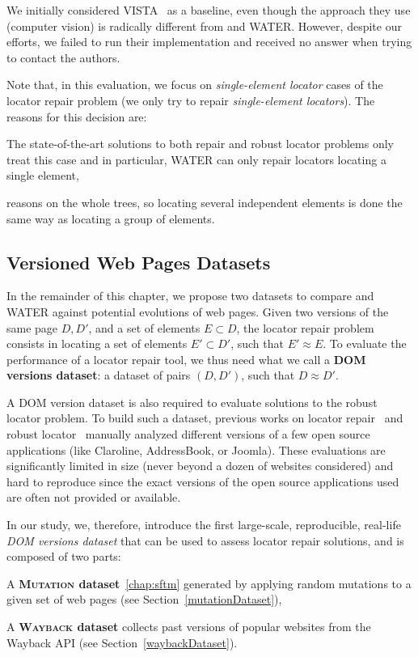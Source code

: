 We initially considered VISTA~\cite{stocco2018visual} as a baseline, even though the approach they use (computer vision) is radically different from \erratum{} and WATER.
However, despite our efforts, we failed to run their implementation and received no answer when trying to contact the authors. 

Note that, in this evaluation, we focus on \textit{single-element locator} cases of the locator repair problem (we only try to repair \textit{single-element locators}).
The reasons for this decision are:
\begin{inparaenum}
    \item The state-of-the-art solutions to both repair and robust locator problems only treat this case and in particular, WATER can only repair locators locating a single element,
    \item \erratum{} reasons on the whole trees, so locating several independent elements is done the same way as locating a group of elements.
\end{inparaenum}

\subsection{Versioned Web Pages Datasets}
In the remainder of this chapter, we propose two datasets to compare \erratum{} and WATER against potential evolutions of web pages.
Given two versions of the same page $D, D'$, and a set of elements $E \subset D$, the locator repair problem consists in locating a set of elements $E' \subset D'$, such that $E' \approx E$.
To evaluate the performance of a locator repair tool, we thus need what we call a \textbf{DOM versions dataset}: a dataset of pairs $(D, D')$, such that $D \approx D'$.

A DOM version dataset is also required to evaluate solutions to the robust locator problem.
To build such a dataset, previous works on locator repair~\cite{leotta2016robula+,leotta2014reducing} and robust locator~\cite{stocco2018visual,choudhary2011water,hammoudi2016waterfall} manually analyzed different versions of a few open source applications (like Claroline, AddressBook, or Joomla).
These evaluations are significantly limited in size (never beyond a dozen of websites considered) and hard to reproduce since the exact versions of the open source applications used are often not provided or available.

In our study, we, therefore, introduce the first large-scale, reproducible, real-life \textit{DOM versions dataset} that can be used to assess locator repair solutions, and is composed of two parts:
\begin{compactenum}
    \item A {\bf \textsc{Mutation} dataset}~\ref{chap:sftm} generated by applying random mutations to a given set of web pages (see Section~\ref{mutationDataset}),
    \item A {\bf \textsc{Wayback} dataset} collects past versions of popular websites from the Wayback API (see Section~\ref{waybackDataset}).
\end{compactenum}


